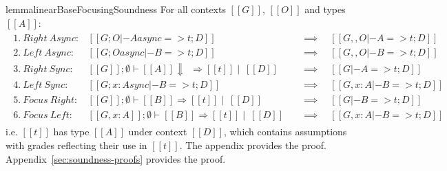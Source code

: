 \begin{restatable}{lemma}{linearBaseFocusingSoundness}
  For all contexts $[[ G ]]$, $[[ O ]]$ and types $[[ A ]]$:
  \begin{align*}
  \begin{array}{lll}
   1.\ Right\ Async: & [[ G ; O |- A async => t ; D ]] \quad &\implies \quad [[ G ,, O |- A => t ; D ]]\\
   2.\ Left\ Async: & [[ G ; O async |- B => t ; D ]] \quad &\implies \quad [[ G ,, O |- B => t ; D ]]\\
   3.\ Right\ Sync: & [[ G ]] ; \emptyset \vdash [[ A ]] \Downarrow\ \ \Rightarrow [[ t ]] \mid\  [[ D ]] \quad &\implies \quad [[ G |- A => t ; D ]]\\
   4.\ Left\ Sync: & [[ G ; {x : A} sync |- B => t ; D ]] \quad &\implies \quad [[ G, x : A |- B => t ; D ]]\\
   5.\ Focus\ Right: & [[ G ]] ; \emptyset \vdash [[ B]] \Rightarrow [[ t]] \mid\ [[ D ]] \quad &\implies \quad [[ G |- B => t ; D ]]\\
   6.\ Focus\ Left: & [[ G, x : A]] ; \emptyset \vdash [[ B]] \Rightarrow [[t ]] \mid\ [[ D ]] \quad &\implies \quad [[ G, x : A |- B => t ; D ]]
  \end{array}
  \end{align*}
i.e. $[[ t ]]$ has type $[[ A ]]$
under context $[[ D ]]$,
which contains assumptions with grades reflecting their use in $[[ t ]]$.
The appendix provides the proof.
Appendix~\ref{sec:soundness-proofs} provides the proof.
  \end{restatable}


